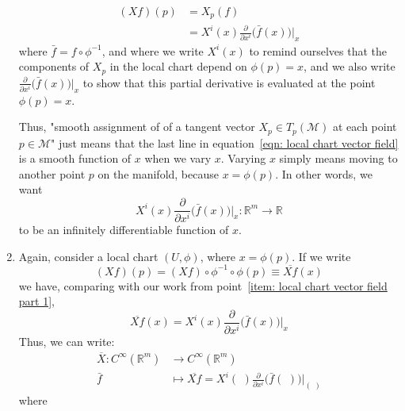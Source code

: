 \begin{remark}
\begin{enumerate}
{        \begin{equation}
          \label{eqn: local chart vector field}
          \begin{split}
          (Xf)(p) &= X_p(f) \\
          &= X^i(x) \frac{\partial}{\partial x^i}\Big(\bar{f}(x)\Big)\Bigr|_{x}
          \end{split}
        \end{equation}
        where $\bar{f} = f \circ \phi^{-1}$, and where we write $X^i(x)$ to
        remind ourselves that the components of $X_p$ in the local chart
        depend on $\phi(p) = x$, and we also write $\frac{\partial}{\partial
        x^i}\big(\bar{f}(x)\big)\Bigr|_{x}$ to show that this partial
        derivative is evaluated at the point $\phi(p) = x$.
        
        Thus, "smooth assignment of of a tangent vector $X_p \in
        T_p(\mathcal{M})$ at each point $p\in\mathcal{M}$" just means that
        the last line in equation~\ref{eqn: local chart vector field} is a
        smooth function of $x$ when we vary $x$. Varying $x$ simply means
        moving to another point $p$ on the manifold, because $x = \phi(p)$.
        In other words, we want \[X^i(x) \frac{\partial}{\partial
        x^i}\Big(\bar{f}(x)\Big)\Bigr|_{x}: \mathbb{R}^m \rightarrow
        \mathbb{R}\] to be an infinitely differentiable function of $x$.}
        \item{\label{item: local chart vector field part 2}Again, consider a
        local chart $(U, \phi)$, where $x = \phi(p)$. If we write
        \begin{equation*}
          (Xf)(p) = (Xf) \circ \phi^{-1} \circ \phi(p) \equiv \overline{Xf}(x)
        \end{equation*}
        we have, comparing with our work from point~\ref{item: local chart
        vector field part 1},
        \begin{equation*}
          \overline{Xf}(x) = X^i(x) \frac{\partial}{\partial
          x^i}\Big(\bar{f}(x)\Big)\Bigr|_{x}
        \end{equation*}
        Thus, we can write: 
        \begin{align*}
        \overline{X}: C^\infty(\mathbb{R}^m) &\rightarrow C^\infty(\mathbb{R}^m)\\
        \bar{f} &\mapsto \overline{Xf}  = X^i(\,\,) \frac{\partial}{\partial
        x^i}\Big(\bar{f}(\,\,)\Big)\Bigr|_{(\,\,)}
        \end{align*}
        where
        \begin{align*}

\end{align*}}
\end{enumerate}
\end{remark}
